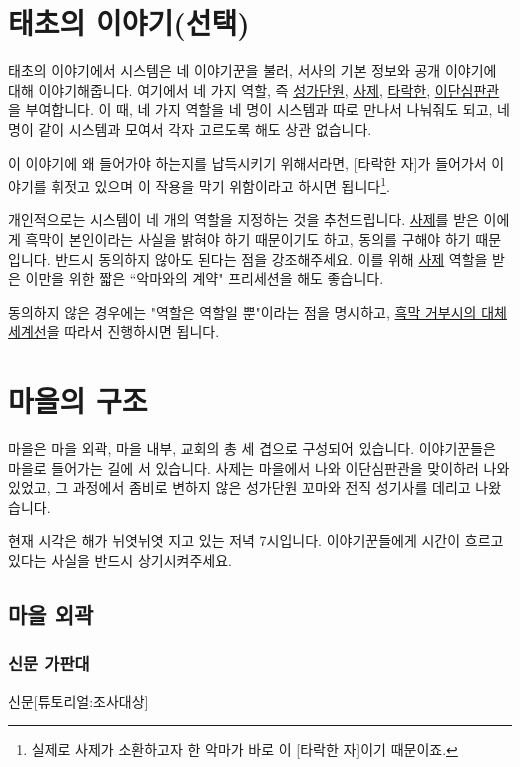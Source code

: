 \documentclass{report}
\begin{document}
	\section{태초의 이야기(선택)}
		태초의 이야기에서 시스템은 네 이야기꾼을 불러, 서사의 기본 정보와 공개 이야기에 대해 이야기해줍니다. 여기에서 네 가지 역할, 즉 \hyperlink{cursed-bard}{성가단원}, \hyperlink{cowardly-priest}{사제}, \hyperlink{corrupt-paladin}{타락한}, \hyperlink{hurt-rogue}{이단심판관}을 부여합니다. 이 때, 네 가지 역할을 네 명이 시스템과 따로 만나서 나눠줘도 되고, 네명이 같이 시스템과 모여서 각자 고르도록 해도 상관 없습니다.
		
		이 이야기에 왜 들어가야 하는지를 납득시키기 위해서라면, [타락한 자]가 들어가서 이야기를 휘젓고 있으며 이 작용을 막기 위함이라고 하시면 됩니다\footnote{실제로 사제가 소환하고자 한 악마가 바로 이 [타락한 자]이기 때문이죠.}.
		
		개인적으로는 시스템이 네 개의 역할을 지정하는 것을 추천드립니다. \hyperlink{cowardly-priest}{사제}를 받은 이에게 흑막이 본인이라는 사실을 밝혀야 하기 때문이기도 하고, 동의를 구해야 하기 때문입니다. 반드시 동의하지 않아도 된다는 점을 강조해주세요. 이를 위해 \hyperlink{cowardly-priest}{사제} 역할을 받은 이만을 위한 짧은 ``악마와의 계약" 프리세션을 해도 좋습니다.
		
		동의하지 않은 경우에는 "역할은 역할일 뿐"이라는 점을 명시하고, \hyperlink{alternative:no-criminal}{흑막 거부시의 대체 세계선}을 따라서 진행하시면 됩니다.
	
	\section{마을의 구조}
		마을은 마을 외곽, 마을 내부, 교회의 총 세 겹으로 구성되어 있습니다. 이야기꾼들은 마을로 들어가는 길에 서 있습니다. 사제는 마을에서 나와 이단심판관을 맞이하러 나와있었고, 그 과정에서 좀비로 변하지 않은 성가단원 꼬마와 전직 성기사를 데리고 나왔습니다.
		
		현재 시각은 해가 뉘엿뉘엿 지고 있는 저녁 7시입니다. 이야기꾼들에게 시간이 흐르고 있다는 사실을 반드시 상기시켜주세요.
		
			\subsection{마을 외곽}
				\hypertarget{search:newspaper-stand}{}
				\subsubsection*{신문 가판대}
					\begin{spoiler}{신문}{[튜토리얼:조사대상]}
						
						
					\end{spoiler}
				
\end{document}
